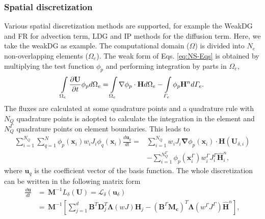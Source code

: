     \subsubsection{{Spatial discretization}}
      Various spatial discretization methods are supported, for example the WeakDG and FR for advection term, LDG  and IP methods for the diffusion term. Here, we take the weakDG as example. The computational domain ($\Omega$)
      is divided into $N_{e}$ non-overlapping elements ($\Omega_{e}$).
      The weak form of Eqs. \eqref{eq:NS-Eqs} is obtained by multiplying the test function $\phi_{p}$ and performing integration by parts in $\Omega_{e}$,
      \begin{equation}
          \intop_{\Omega_{e}}\frac{\partial\mathbf{U}}{\partial t}\phi_{p}d\Omega_{e}=\intop_{\Omega_{e}}\mathbf{\nabla}\phi_{p}\cdot\mathbf{H}d\Omega_{e}-\intop_{\varGamma_{e}}\phi_{p}\mathbf{H}^{n}d\varGamma_{e}.\label{eq:weak-integration}
      \end{equation}
      The fluxes are calculated at some quadrature points and a quadrature rule with $N_{Q}$ quadrature points is adopted to calculate the integration in the element and $N_{Q}^{\varGamma}$ quadrature points on element boundaries. This leads to
      \begin{equation}
          \begin{aligned}\sum_{i=1}^{N_{Q}}\sum_{q=1}^{N}\phi_{p}\left(\mathbf{x}_{i}\right)w_{i}J_{i}\phi_{q}\left(\mathbf{x}_{i}\right)\frac{d\mathbf{u}_{q}}{dt}= & \sum_{i=1}^{N_{Q}}w_{i}J_{i}\mathbf{\nabla}\phi_{p}\left(\mathbf{x}_{i}\right)\cdot\mathbf{H}\left(\mathbf{U}_{\delta,i}\right) 
          \\ 
          & -\sum_{i=1}^{N_{Q}^{\varGamma}}\phi_{p}\left(\mathbf{x}_{i}^{\varGamma}\right)w_{i}^{\varGamma}J_{i}^{\varGamma}\hat{\mathbf{H}}_{i}^{n},
          \end{aligned}
          \label{eq:discrete-form-Equations}
      \end{equation}
      where ${\mathbf{u}_{q}}$ is the coefficient vector of the basis function. 
      The whole discretization can
      be written in the following matrix form
      \begin{equation}
          \begin{aligned}
            \frac{d\mathbf{u}}{dt} 
            & = \,\mathbf{M}^{-1} \textit{L}_{\delta}\left(\mathbf{U}\right) = \mathcal{L}_\delta \left(\textbf{u}_{\delta}\right)                          \\
            & = \,\mathbf{M}^{-1}\left[\sum_{j=1}^{d}\mathbf{B}^{T}\mathbf{D}_{j}^{T}\mathbf{\Lambda}\left(wJ\right)\mathbf{H}_{j} -\left(\mathbf{B}^{\varGamma}\mathbf{M_{c}}\right)^{T}\mathbf{\Lambda}\left(w^{\varGamma}J^{\varGamma}\right)\hat{\mathbf{H}}^{n} \right],
          \end{aligned}
          \label{eq:matrix-form-equations}
      \end{equation}
